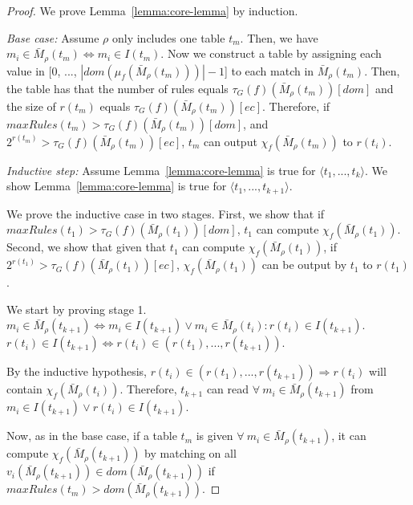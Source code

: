 \begin{proof}
\noindent We prove Lemma~\ref{lemma:core-lemma} by induction. %
\vspace{1mm}

\noindent \textit{Base case:} Assume $\rho$ only includes one table $t_m$. Then, we have $m_i \in \bar{M}_\rho(t_m) \Leftrightarrow m_i \in I(t_m)$. Now we construct a table by assigning each value in [$0$, $...$, $|dom(\mu_f(\bar{M}_\rho(t_m)))|-1$] to each match in $\bar{M}_\rho(t_m)$. Then, the table has that the number of rules equals $\tau_G(f)(\bar{M}_\rho(t_m))[dom]$ and the size of $r(t_m)$ equals $\tau_G(f)(\bar{M}_\rho(t_m))[ec]$. Therefore, if $maxRules(t_m) > \tau_G(f)(\bar{M}_\rho(t_m))[dom]$, and $2^{r(t_m)} > \tau_G(f)(\bar{M}_\rho(t_m))[ec]$, $t_m$ can output $\chi_f(\bar{M}_\rho(t_m))$ to $r(t_i)$.

\noindent \textit{Inductive step:} Assume Lemma~\ref{lemma:core-lemma} is true for $\langle t_1, ..., t_k \rangle$. We show Lemma~\ref{lemma:core-lemma} is true for $\langle t_1, ..., t_{k+1} \rangle$.

We prove the inductive case in two stages. First, we show that if $maxRules(t_1) > \tau_G(f)(\bar{M}_\rho(t_1))[dom]$, $t_{1}$ can compute $\chi_f(\bar{M}_\rho(t_{1}))$. Second, we show that given that $t_{1}$ can compute $\chi_f(\bar{M}_\rho(t_{1}))$, if $2^{r(t_{1})} > \tau_G(f)(\bar{M}_\rho(t_{1}))[ec]$, $\chi_f(\bar{M}_\rho(t_{1}))$ can be output by $t_1$ to $r(t_{1})$.
\vspace{1mm}

We start by proving stage 1. $m_i \in \bar{M}_\rho(t_{k+1}) \Leftrightarrow m_i \in I(t_{k+1}) \vee m_i \in \bar{M}_\rho(t_{i}) : r(t_i) \in I(t_{k+1})$. $r(t_i) \in I(t_{k+1}) \Leftrightarrow r(t_i) \in (r(t_1), ..., r(t_{k+1}))$.

By the inductive hypothesis, $r(t_i) \in (r(t_1), ..., r(t_{k+1})) \Rightarrow r(t_i)$ will contain $\chi_f(\bar{M}_\rho(t_{i}))$. Therefore, $t_{k+1}$ can read $\forall\ m_i \in \bar{M}_\rho(t_{k+1})$ from $m_i \in I(t_{k+1}) \vee r(t_i) \in I(t_{k+1})$.
\vspace{1mm}

Now, as in the base case, if a table $t_m$ is given $\forall\ m_i \in \bar{M}_\rho(t_{k+1})$, it can compute $\chi_f(\bar{M}_\rho(t_{k+1}))$ by matching on all $v_i(\bar{M}_\rho(t_{k+1})) \in dom(\bar{M}_\rho(t_{k+1}))$ if $maxRules(t_{m}) > dom(\bar{M}_\rho(t_{k+1}))$.
\vspace{1mm}


\end{proof}
